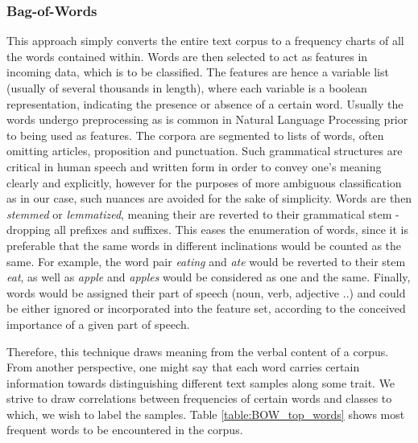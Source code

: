 	\subsubsection{Bag-of-Words}
	\label{sec:bag_of_words}
		This approach simply converts the entire text corpus to a frequency charts of all the words contained within. Words are then selected to act as features in incoming data, which is to be classified. The features are hence a variable list (usually of several thousands in length), where each variable is a boolean representation, indicating the presence or absence of a certain word. Usually the words undergo preprocessing as is common in Natural Language Processing prior to being used as features. The corpora are segmented to lists of words, often omitting articles, proposition and punctuation. Such grammatical structures are critical in human speech and written form in order to convey one's meaning clearly and explicitly, however for the purposes of more ambiguous classification as in our case, such nuances are avoided for the sake of simplicity. Words are then \textit{stemmed} or \textit{lemmatized}, meaning their are reverted to their grammatical stem - dropping all prefixes and suffixes. This eases the enumeration of words, since it is preferable that the same words in different inclinations would be counted as the same. For example, the word pair \textit{eating} and \textit{ate} would be reverted to their stem \textit{eat}, as well as \textit{apple} and \textit{apples} would be considered as one and the same. Finally, words would be assigned their part of speech (noun, verb, adjective ..) and could be either ignored or incorporated into the feature set, according to the conceived importance of a given part of speech.
	
		Therefore, this technique draws meaning from the verbal content of a corpus. From another perspective, one might say that each word carries certain information towards distinguishing different text samples along some trait. We strive to draw correlations between frequencies of certain words and classes to which, we wish to label the samples. Table \ref{table:BOW_top_words} shows most frequent words to be encountered in the corpus. 
	
